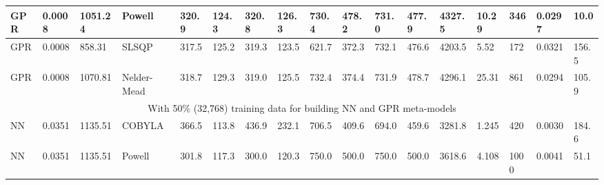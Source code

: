 \begin{tabular}{|lllllllllllllllll|}
\multicolumn{1}{|l|}{GPR} & \multicolumn{1}{l|}{0.0008} & \multicolumn{1}{l|}{1051.24} & \multicolumn{1}{l|}{Powell} & \multicolumn{1}{l|}{320.9} & \multicolumn{1}{l|}{124.3} & \multicolumn{1}{l|}{320.8} & \multicolumn{1}{l|}{126.3} & \multicolumn{1}{l|}{730.4} & \multicolumn{1}{l|}{478.2} & \multicolumn{1}{l|}{731.0} & \multicolumn{1}{l|}{477.9} & \multicolumn{1}{l|}{4327.5} & \multicolumn{1}{l|}{10.29} & \multicolumn{1}{l|}{346} & \multicolumn{1}{l|}{0.0297} & 10.0 \\ \hline
\multicolumn{1}{|l|}{GPR} & \multicolumn{1}{l|}{0.0008} & \multicolumn{1}{l|}{858.31} & \multicolumn{1}{l|}{SLSQP} & \multicolumn{1}{l|}{317.5} & \multicolumn{1}{l|}{125.2} & \multicolumn{1}{l|}{319.3} & \multicolumn{1}{l|}{123.5} & \multicolumn{1}{l|}{621.7} & \multicolumn{1}{l|}{372.3} & \multicolumn{1}{l|}{732.1} & \multicolumn{1}{l|}{476.6} & \multicolumn{1}{l|}{4203.5} & \multicolumn{1}{l|}{5.52} & \multicolumn{1}{l|}{172} & \multicolumn{1}{l|}{0.0321} & 156.5 \\ \hline
\multicolumn{1}{|l|}{GPR} & \multicolumn{1}{l|}{0.0008} & \multicolumn{1}{l|}{1070.81} & \multicolumn{1}{l|}{Nelder-Mead} & \multicolumn{1}{l|}{318.7} & \multicolumn{1}{l|}{129.3} & \multicolumn{1}{l|}{319.0} & \multicolumn{1}{l|}{125.5} & \multicolumn{1}{l|}{732.4} & \multicolumn{1}{l|}{374.4} & \multicolumn{1}{l|}{731.9} & \multicolumn{1}{l|}{478.7} & \multicolumn{1}{l|}{4296.1} & \multicolumn{1}{l|}{25.31} & \multicolumn{1}{l|}{861} & \multicolumn{1}{l|}{0.0294} & 105.9 \\ \hline
\multicolumn{17}{|c|}{With 50\% (32,768) training data for building NN and GPR meta-models} \\ \hline
\multicolumn{1}{|l|}{NN} & \multicolumn{1}{l|}{0.0351} & \multicolumn{1}{l|}{1135.51} & \multicolumn{1}{l|}{COBYLA} & \multicolumn{1}{l|}{366.5} & \multicolumn{1}{l|}{113.8} & \multicolumn{1}{l|}{436.9} & \multicolumn{1}{l|}{232.1} & \multicolumn{1}{l|}{706.5} & \multicolumn{1}{l|}{409.6} & \multicolumn{1}{l|}{694.0} & \multicolumn{1}{l|}{459.6} & \multicolumn{1}{l|}{3281.8} & \multicolumn{1}{l|}{1.245} & \multicolumn{1}{l|}{420} & \multicolumn{1}{l|}{0.0030} & 184.6 \\ \hline
\multicolumn{1}{|l|}{NN} & \multicolumn{1}{l|}{0.0351} & \multicolumn{1}{l|}{1135.51} & \multicolumn{1}{l|}{Powell} & \multicolumn{1}{l|}{301.8} & \multicolumn{1}{l|}{117.3} & \multicolumn{1}{l|}{300.0} & \multicolumn{1}{l|}{120.3} & \multicolumn{1}{l|}{750.0} & \multicolumn{1}{l|}{500.0} & \multicolumn{1}{l|}{750.0} & \multicolumn{1}{l|}{500.0} & \multicolumn{1}{l|}{3618.6} & \multicolumn{1}{l|}{4.108} & \multicolumn{1}{l|}{1000} & \multicolumn{1}{l|}{0.0041} & 51.1 \\ \hline

\end{tabular}

